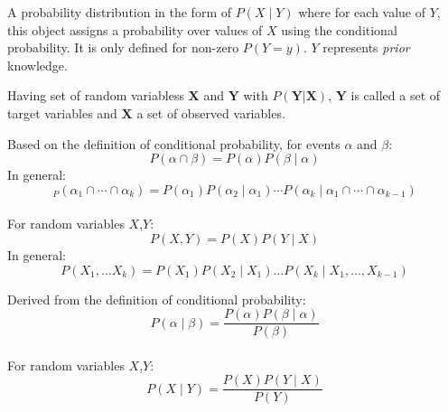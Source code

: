 {%
}

{%
  A \gls{probability distribution} in the form of $P(X\mid Y)$ where for each value of $Y$, this object assigns a probability over values of $X$ using the \gls{conditional probability}. It is only defined for non-zero $P(Y=y)$. $Y$ represents \textit{prior} knowledge.

  Having \glspl{set of random variables} $\bm{X}$ and $\bm{Y}$ with $P(\bm{Y}|\bm{X})$, $\bm{Y}$ is called a set of \glspl{target variable} and $\bm{X}$ a set of \glspl{observed variable}.
}

{%
  Based on the definition of \gls{conditional probability}, for events $\alpha$ and $\beta$:
  \begin{equation*}
    P(\alpha\cap\beta)=P(\alpha)P(\beta\mid\alpha)
  \end{equation*}
  In general:
  \begin{equation*}
    _P(\alpha_1\cap\cdots\cap\alpha_k)=P(\alpha_1)P(\alpha_2\mid\alpha_1)\cdots P(\alpha_k\mid\alpha_1\cap\cdots\cap\alpha_{k-1})
  \end{equation*}\\[0.1cm]
  For \glspl{random variable} $X$,$Y$:
  \begin{equation*}
    P(X,Y)=P(X)P(Y\mid X)
  \end{equation*}
  In general:
  \begin{equation*}
    P(X_1,\ldots X_k)=P(X_1)P(X_2\mid X_1)\ldots P(X_k\mid X_1,\ldots,X_{k-1})
  \end{equation*}

}

{%
  Derived from the definition of \gls{conditional probability}:
  \begin{equation*}
    P(\alpha\mid\beta)=\frac{P(\alpha)P(\beta\mid\alpha)}{P(\beta)}
  \end{equation*}\\[0.1cm]

  For \glspl{random variable} $X$,$Y$:
  \begin{equation*}
    P(X\mid Y)=\frac{P(X)P(Y\mid X)}{P(Y)}
  \end{equation*}
}

